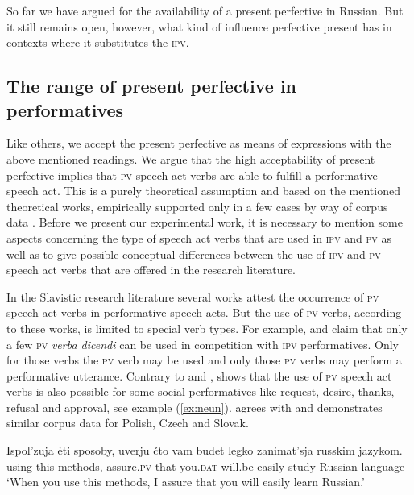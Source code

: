 \documentclass[output=paper,
colorlinks,
citecolor=brown,
newtxmath,
hidelinks
]{langscibook}
\begin{document}
So far we have argued for the availability of a present perfective in Russian. But it still remains open, however, what kind of influence perfective present has in contexts where it substitutes the \textsc{ipv}. 

\subsection{The range of present perfective in performatives}\label{sub:eins:5}

Like others, we accept the present perfective as means of expressions with the above mentioned readings. We argue that the high acceptability of present perfective implies that \textsc{pv} speech act verbs are able to fulfill a performative speech act. This is a purely theoretical assumption and based on the mentioned theoretical works, empirically supported only in a few cases by way of corpus data \citep{Laczinski2014,Wiemer2014}. Before we  present our experimental work, it is necessary to mention some aspects concerning the type of speech act verbs that are used in \textsc{ipv} and \textsc{pv} as well as to give possible conceptual differences between the use of \textsc{ipv} and \textsc{pv} speech act verbs that are offered in the research literature.

In the Slavistic research literature several works attest the occurrence of \textsc{pv} speech act verbs in performative speech acts. But the use of \textsc{pv} verbs, according to these works, is limited to special verb types. For example, \citet{Rjabceva1992} and \citet{Dickey2000} claim that only a few \textsc{pv} \textit{verba dicendi} can be used in competition with \textsc{ipv} performatives. Only for those verbs the \textsc{pv} verb may be used and only those \textsc{pv} verbs may perform a performative utterance. Contrary to \citeauthor{Rjabceva1992} and \citeauthor{Dickey2000}, \citeauthor{Wiemer2014} shows that the use of \textsc{pv} speech act verbs is also possible for some social performatives like request, desire, thanks, refusal and approval, see example (\ref{ex:neun}). \citet{Laczinski2014} agrees with \citeauthor{Wiemer2014} and demonstrates similar corpus data for Polish, Czech and Slovak.

\ea\label{ex:neun}
\gll Ispol’zuja ėti sposoby, uverju čto vam budet legko zanimat’sja russkim jazykom.\\
             using               this         methods,	assure\textsc{.pv}	   that	         you.\textsc{dat}	  will.be        easily          study         Russian                 language\\
\glt ‘When you use this methods, I assure that you will easily learn Russian.’\\
\hfill \citep[107]{Wiemer2014}
\z
\end{document}
